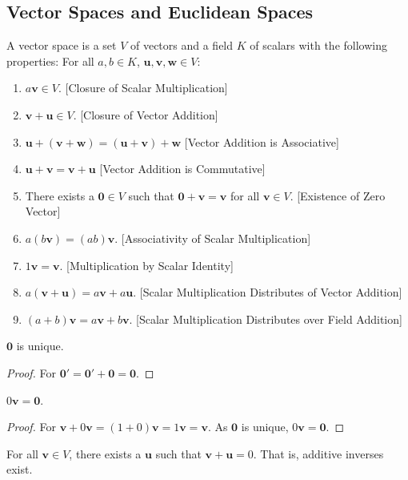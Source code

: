 \documentclass[crop=false,class=book]{standalone}
\begin{document}
\subsection{Vector Spaces and Euclidean Spaces}
\begin{definition}
A vector space is a set $V$ of vectors and a field $K$ of scalars with the following properties: For all $a,b\in K$, $\mathbf{u,v,w}\in V$:
\begin{enumerate}
    \item $a\mathbf{v} \in V$. \hfill [Closure of Scalar Multiplication]
    \item $\mathbf{v}+\mathbf{u} \in V$. \hfill [Closure of Vector Addition]
    \item $\mathbf{u}+(\mathbf{v}+\mathbf{w}) = (\mathbf{u}+\mathbf{v})+\mathbf{w}$ \hfill [Vector Addition is Associative]
    \item $\mathbf{u}+\mathbf{v}=\mathbf{v}+\mathbf{u}$ \hfill [Vector Addition is Commutative]
    \item There exists a $\mathbf{0}\in V$ such that $\mathbf{0}+\mathbf{v}=\mathbf{v}$ for all $\mathbf{v}\in V$. \hfill [Existence of Zero Vector]
    \item $a(b\mathbf{v}) = (ab)\mathbf{v}$. \hfill [Associativity of Scalar Multiplication]
    \item $1 \mathbf{v} = \mathbf{v}$. \hfill[Multiplication by Scalar Identity]
    \item $a(\mathbf{v}+\mathbf{u}) = a\mathbf{v}+a\mathbf{u}$. \hfill [Scalar Multiplication Distributes of Vector Addition]
    \item $(a+b)\mathbf{v}= a\mathbf{v}+b\mathbf{v}$. \hfill [Scalar Multiplication Distributes over Field Addition]
\end{enumerate}
\end{definition}
\begin{theorem}
$\mathbf{0}$ is unique.
\end{theorem}
\begin{proof}
For $\mathbf{0}'=\mathbf{0}'+\mathbf{0}=\mathbf{0}$.
\end{proof}
\begin{theorem}
$0\mathbf{v} = \mathbf{0}$.
\end{theorem}
\begin{proof}
For $\mathbf{v}+0\mathbf{v} = (1+0)\mathbf{v} = 1\mathbf{v} = \mathbf{v}$. As $\mathbf{0}$ is unique, $0\mathbf{v}=\mathbf{0}$.
\end{proof}
\begin{theorem}
For all $\mathbf{v}\in V$, there exists a $\mathbf{u}$ such that $\mathbf{v}+\mathbf{u}=0$. That is, additive inverses exist.
\end{theorem}
\end{document}
